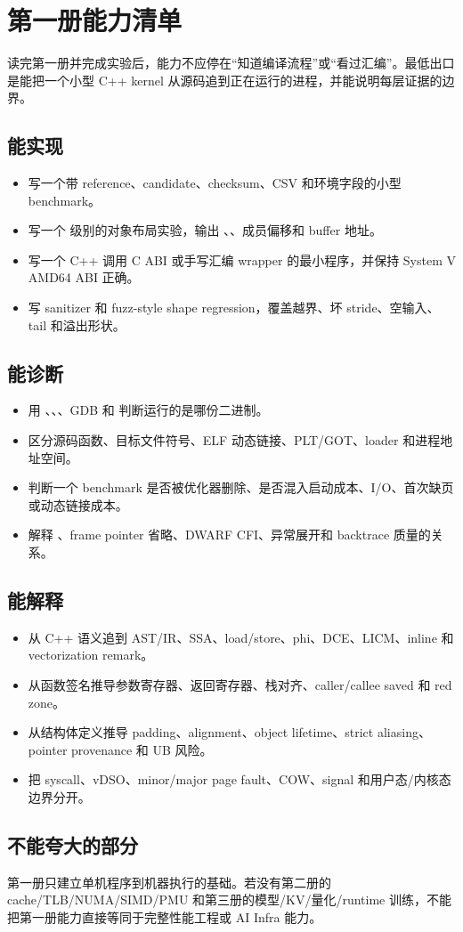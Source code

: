 \chapter*{第一册能力清单}

读完第一册并完成实验后，能力不应停在“知道编译流程”或“看过汇编”。最低出口是能把一个小型 C++ kernel 从源码追到正在运行的进程，并能说明每层证据的边界。

\section*{能实现}

\begin{itemize}
  \item 写一个带 reference、candidate、checksum、CSV 和环境字段的小型 benchmark。
  \item 写一个  级别的对象布局实验，输出 、、成员偏移和 buffer 地址。
  \item 写一个 C++ 调用 C ABI 或手写汇编 wrapper 的最小程序，并保持 System V AMD64 ABI 正确。
  \item 写 sanitizer 和 fuzz-style shape regression，覆盖越界、坏 stride、空输入、tail 和溢出形状。
\end{itemize}

\section*{能诊断}

\begin{itemize}
  \item 用 、、、GDB 和  判断运行的是哪份二进制。
  \item 区分源码函数、目标文件符号、ELF 动态链接、PLT/GOT、loader 和进程地址空间。
  \item 判断一个 benchmark 是否被优化器删除、是否混入启动成本、I/O、首次缺页或动态链接成本。
  \item 解释 、frame pointer 省略、DWARF CFI、异常展开和 backtrace 质量的关系。
\end{itemize}

\section*{能解释}

\begin{itemize}
  \item 从 C++ 语义追到 AST/IR、SSA、load/store、phi、DCE、LICM、inline 和 vectorization remark。
  \item 从函数签名推导参数寄存器、返回寄存器、栈对齐、caller/callee saved 和 red zone。
  \item 从结构体定义推导 padding、alignment、object lifetime、strict aliasing、pointer provenance 和 UB 风险。
  \item 把 syscall、vDSO、minor/major page fault、COW、signal 和用户态/内核态边界分开。
\end{itemize}

\section*{不能夸大的部分}

第一册只建立单机程序到机器执行的基础。若没有第二册的 cache/TLB/NUMA/SIMD/PMU 和第三册的模型/KV/量化/runtime 训练，不能把第一册能力直接等同于完整性能工程或 AI Infra 能力。
